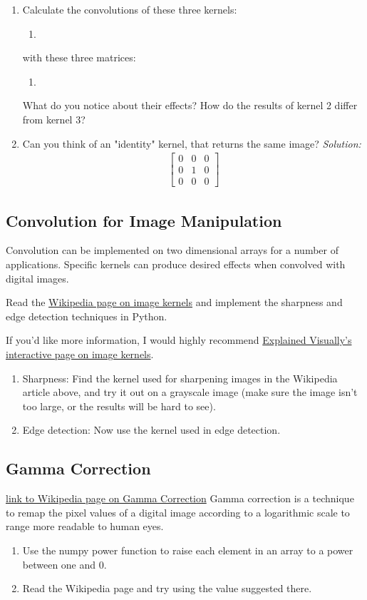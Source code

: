 \documentclass{tufte-handout}
\newcommand{\threebythree}[9]{\ensuremath{\begin{bmatrix} #1 & #2 & #3 \\ #4 & #5 & #6 \\ #7 & #8 & #9 \end{bmatrix}}}
\begin{document}
\begin{enumerate}
\item Calculate the convolutions of these three kernels:
    \begin{enumerate}
        \item
    \end{enumerate}
    with these three matrices:
    \begin{enumerate}
        \item
    \end{enumerate}
    What do you notice about their effects? How do the results of kernel 2 differ from kernel 3?
\item Can you think of an "identity" kernel, that returns the same image?
\linebreak
\emph{Solution:}
\begin{align*}
    \threebythree{0}{0}{0}{0}{1}{0}{0}{0}{0}
\end{align*}
\end{enumerate}

\subsection{Convolution for Image Manipulation}  %
Convolution can be implemented on two dimensional arrays for a number of applications. Specific kernels can produce desired effects when convolved with digital images.

Read the \href{https://en.wikipedia.org/wiki/Kernel_(image_processing)}{Wikipedia page on image kernels} and implement the sharpness and edge detection techniques in Python.

If you'd like more information, I would highly recommend \href{http://setosa.io/ev/image-kernels/}{Explained Visually's interactive page on image kernels}.

\begin{enumerate}[resume]
\item Sharpness:
Find the kernel used for sharpening images in the Wikipedia article above, and try it out on a grayscale image (make sure the image isn't too large, or the results will be hard to see).
\item Edge detection: Now use the kernel used in edge detection.
\end{enumerate}


\subsection{Gamma Correction}  %
\href{https://en.wikipedia.org/wiki/Gamma_correction}{link to Wikipedia page on Gamma Correction}
Gamma correction is a technique to remap the pixel values of a digital image according to a logarithmic scale to range more readable to human eyes.
\begin{enumerate}
    \item Use the numpy power function to raise each element in an array to a power between one and 0.
    \item Read the Wikipedia page and try using the value suggested there.
\end{enumerate}
\end{document}
